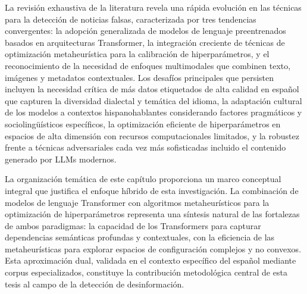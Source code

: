 La revisión exhaustiva de la literatura revela una rápida evolución en las técnicas para la detección de noticias falsas, caracterizada por tres tendencias convergentes: la adopción generalizada de modelos de lenguaje preentrenados basados en arquitecturas Transformer, la integración creciente de técnicas de optimización metaheurística para la calibración de hiperparámetros, y el reconocimiento de la necesidad de enfoques multimodales que combinen texto, imágenes y metadatos contextuales. Los desafíos principales que persisten incluyen la necesidad crítica de más datos etiquetados de alta calidad en español que capturen la diversidad dialectal y temática del idioma, la adaptación cultural de los modelos a contextos hispanohablantes considerando factores pragmáticos y sociolingüísticos específicos, la optimización eficiente de hiperparámetros en espacios de alta dimensión con recursos computacionales limitados, y la robustez frente a técnicas adversariales cada vez más sofisticadas incluido el contenido generado por LLMs modernos.

La organización temática de este capítulo proporciona un marco conceptual integral que justifica el enfoque híbrido de esta investigación. La combinación de modelos de lenguaje Transformer con algoritmos metaheurísticos para la optimización de hiperparámetros representa una síntesis natural de las fortalezas de ambos paradigmas: la capacidad de los Transformers para capturar dependencias semánticas profundas y contextuales, con la eficiencia de las metaheurísticas para explorar espacios de configuración complejos y no convexos. Esta aproximación dual, validada en el contexto específico del español mediante corpus especializados, constituye la contribución metodológica central de esta tesis al campo de la detección de desinformación.

